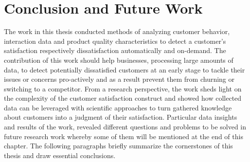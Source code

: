 \chapter{Conclusion and Future Work}
\label{ch:conclusion}

The work in this thesis conducted methods of analyzing customer behavior, interaction data and product quality characteristics to detect a customer's satisfaction respectively dissatisfaction automatically and on-demand. The contribution of this work should help businesses, processing large amounts of data, to detect potentially dissatisfied customers at an early stage to tackle their issues or concerns pro-actively and as a result prevent them from churning or switching to a competitor. From a research perspective, the work sheds light on the complexity of the customer satisfaction construct and showed how collected data can be leveraged with scientific approaches to turn gathered knowledge about customers into a judgment of their satisfaction. Particular data insights and results of the work, revealed different questions and problems to be solved in future research work whereby some of them will be mentioned at the end of this chapter. The following paragraphs briefly summarize the cornerstones of this thesis and draw essential conclusions.

